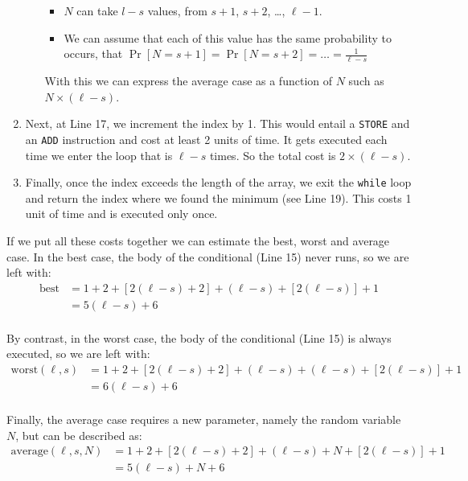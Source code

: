 \documentclass[11pt]{article}
\begin{document}
\begin{enumerate}
\begin{itemize}
\begin{itemize}
\item \(N\) can take \(l-s\) values, from \(s+1\), \(s+2\), \ldots, \(\ell-1\).

\item We can assume that each of this value has the same
probability to occurs, that \(\Pr[N=s+1] = \Pr[N=s+2] = \ldots =
         \frac{1}{\ell-s}\)
\end{itemize}

With this we can express the average case as a function of \(N\)
such as \(N \times (\ell - s)\).
\end{itemize}

\item Next, at Line 17, we increment the index by 1. This would entail
a \texttt{STORE} and an \texttt{ADD} instruction and cost at least 2 units of
time. It gets executed each time we enter the loop that is
\(\ell-s\) times. So the total cost is \(2 \times (\ell-s)\).

\item Finally, once the index exceeds the length of the array, we exit
the \texttt{while} loop and return the index where we found the minimum
(see Line 19). This costs 1 unit of time and is executed only
once.
\end{enumerate}

If we put all these costs together we can estimate the best, worst and
average case. In the best case, the body of the conditional (Line 15)
never runs, so we are left with:
\begin{align*}
   \text{best} & = 1 + 2 + [2 (\ell-s) + 2] + (\ell-s) + [2(\ell-s)] + 1 \\
               &= 5 (\ell-s) + 6 \\
\end{align*}

By contrast, in the worst case, the body of the conditional (Line 15)
is always executed, so we are left with:
\begin{align*}
   \text{worst}(\ell, s) & = 1 + 2 + [2 (\ell-s) + 2] + (\ell-s) + (\ell-s) + [2(\ell-s)] + 1 \\
               &= 6 (\ell-s) + 6 \\
\end{align*}

Finally, the average case requires a new parameter, namely the random
variable \(N\), but can be described as:
\begin{align*}
   \text{average}(\ell, s, N) & = 1 + 2 + [2 (\ell-s) + 2] + (\ell-s) + N + [2(\ell-s)] + 1 \\
                              &= 5(\ell-s) + N + 6 \\
\end{align*}
\end{document}
